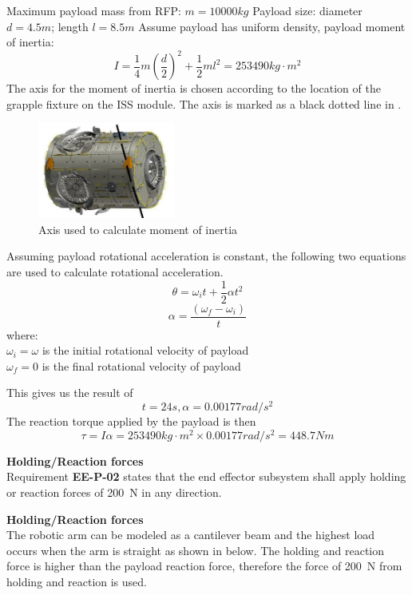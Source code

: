 Maximum payload mass from RFP: $m=10000kg$
Payload size: diameter $d=4.5 m$; length $l=8.5 m$
Assume payload has uniform density, payload moment of inertia:
$$I=\frac{1}{4}m(\frac{d}{2})^2+\frac{1}{2}ml^2=253490 kg\cdot m^2$$
The axis for the moment of inertia is chosen according to the location of the grapple fixture on the ISS module\cite{ISS_Harmony}. The axis is marked as a black dotted line in .

\begin{figure}[H]
\centering
\includegraphics[width=0.4\textwidth]{Apppic/harmony}
\caption{Axis used to calculate moment of inertia}
\label{fig:harmony_axis}
\end{figure}

Assuming payload rotational acceleration is constant, the following two equations are used to calculate rotational acceleration.
\begin{equation}
\theta=\omega_it+\frac{1}{2}\alpha t^2
\end{equation}
\begin{equation}
\alpha=\frac{(\omega_f-\omega_i)}{t}
\end{equation}
where:\\
$\omega_i=\omega$ is the initial rotational velocity of payload\\
$\omega_f=0$ is the final rotational velocity of payload

This gives us the result of $$t=24s, \alpha=0.00177rad/s^2$$
The reaction torque applied by the payload is then
$$\tau=I\alpha=253490kg\cdot m^2\times 0.00177rad/s^2=448.7Nm$$

\large \textbf{Holding/Reaction forces}\\
\normalsize Requirement \textbf{EE-P-02} states that the end effector subsystem shall apply holding or reaction forces of \SI{200}{\newton} in any direction.

\large \textbf{Holding/Reaction forces}\\
\normalsize The robotic arm can be modeled as a cantilever beam and the highest load occurs when the arm is straight as shown in  below. The holding and reaction force is higher than the payload reaction force, therefore the force of \SI{200}{\newton} from holding and reaction is used.

